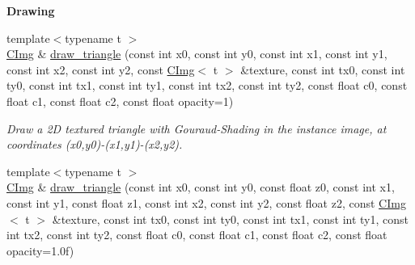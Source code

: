 \begin{Indent}{\bf Drawing}
\begin{DoxyCompactItemize}
\item 
{\footnotesize template$<$typename t $>$ }\\\hyperlink{structcimg__library_1_1_c_img}{C\-Img} \& \hyperlink{structcimg__library_1_1_c_img_a6f8b7dc39e303d325e688148849fc8ff}{draw\-\_\-triangle} (const int x0, const int y0, const int x1, const int y1, const int x2, const int y2, const \hyperlink{structcimg__library_1_1_c_img}{C\-Img}$<$ t $>$ \&texture, const int tx0, const int ty0, const int tx1, const int ty1, const int tx2, const int ty2, const float c0, const float c1, const float c2, const float opacity=1)
\begin{DoxyCompactList}\small\item\em Draw a 2\-D textured triangle with Gouraud-\/\-Shading in the instance image, at coordinates ({\ttfamily x0},{\ttfamily y0})-\/({\ttfamily x1},{\ttfamily y1})-\/({\ttfamily x2},{\ttfamily y2}). \end{DoxyCompactList}\item 
\hypertarget{structcimg__library_1_1_c_img_ad70eb019682c0c23d8d3ef8bc1ba011f}{{\footnotesize template$<$typename t $>$ }\\\hyperlink{structcimg__library_1_1_c_img}{C\-Img} \& \hyperlink{structcimg__library_1_1_c_img_ad70eb019682c0c23d8d3ef8bc1ba011f}{draw\-\_\-triangle} (const int x0, const int y0, const float z0, const int x1, const int y1, const float z1, const int x2, const int y2, const float z2, const \hyperlink{structcimg__library_1_1_c_img}{C\-Img}$<$ t $>$ \&texture, const int tx0, const int ty0, const int tx1, const int ty1, const int tx2, const int ty2, const float c0, const float c1, const float c2, const float opacity=1.\-0f)}\label{structcimg__library_1_1_c_img_ad70eb019682c0c23d8d3ef8bc1ba011f}


\end{DoxyCompactItemize}
\end{Indent}
